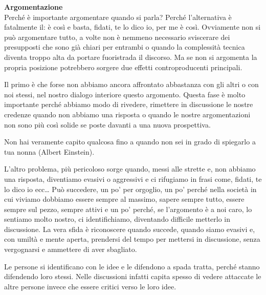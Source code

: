 \documentclass[12pt]{book} %
\begin{document}
\noindent \textbf{\large Argomentazione} \\
Perché è importante argomentare quando si parla? Perché l'alternativa è fatalmente il: è così e
basta, fidati, te lo dico io, per me è così. Ovviamente non si può argomentare tutto, a volte non è nemmeno necessario
sviscerare dei presupposti che sono già chiari per entrambi o quando la complessità tecnica diventa troppo alta da
portare fuoristrada il discorso. Ma se non si argomenta la propria posizione potrebbero sorgere due effetti
controproducenti principali.

Il primo è che forse non abbiamo ancora affrontato abbastanza con gli altri o con noi stessi, nel nostro dialogo
interiore questo argomento. Questa fase è molto importante perché abbiamo modo di rivedere, rimettere in discussione le
nostre credenze quando non abbiamo una risposta o quando le nostre argomentazioni non sono più così solide se poste
davanti a una nuova prospettiva. 

Non hai veramente capito qualcosa fino a quando non sei in grado di spiegarlo a tua nonna (Albert Einstein).

L'altro problema, più pericoloso sorge quando, messi alle strette e, non abbiamo una risposta,
diventiamo evasivi o aggressivi e ci rifugiamo in frasi come, fidati, te lo dico io ecc… Può succedere, un po' per orgoglio, un po'
perché nella società in cui viviamo dobbiamo essere sempre al massimo, sapere sempre tutto, essere sempre sul pezzo,
sempre attivi e un po' perché, se l'argomento è a noi caro, lo sentiamo molto nostro, ci
identifichiamo, diventando difficile metterlo in discussione. La vera sfida è riconoscere quando succede, quando siamo
evasivi e, con umiltà e mente aperta, prendersi del tempo per mettersi in discussione, senza vergognarsi e ammettere di
aver sbagliato. 

Le persone si identificano con le idee e le difendono a spada tratta, perché stanno difendendo loro stessi. Nelle discussioni infatti capita spesso di vedere attaccate le altre persone invece che essere critici verso le loro idee.
\end{document}
